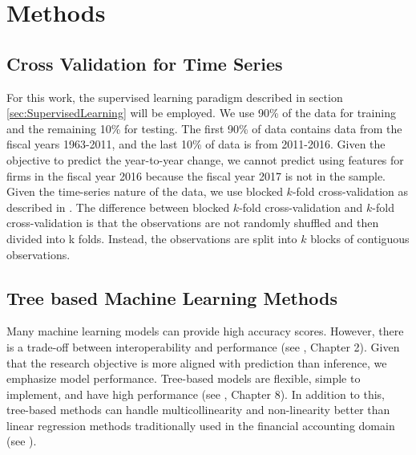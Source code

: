 \section{Methods}

\subsection{Cross Validation for Time Series} \label{sec:CV-TS}

For this work, the supervised learning paradigm described in section \ref{sec:SupervisedLearning} will be employed.  We use 90\% of the data for training and the remaining 10\% for testing. The first 90\% of data contains data from the fiscal years 1963-2011, and the last 10\% of data is from 2011-2016.  Given the objective to predict the year-to-year change, we cannot predict using features for firms in the fiscal year 2016 because the fiscal year 2017 is not in the sample. Given the time-series nature of the data, we use blocked \(k\)-fold cross-validation as described in \cite{cerqueira2019evaluating}. The difference between blocked \(k\)-fold cross-validation and \(k\)-fold cross-validation is that the observations are not randomly shuffled and then divided into k folds. Instead, the observations are split into \(k\) blocks of contiguous observations. 


\subsection{Tree based Machine Learning Methods}

Many machine learning models can provide high accuracy scores. However, there is a trade-off between interoperability and performance (see  \cite{ISL}, Chapter 2).  Given that the research objective is more aligned with prediction than inference, we emphasize model performance. Tree-based models are flexible, simple to implement, and have high performance (see \cite{ISL},  Chapter 8). In addition to this, tree-based methods can handle multicollinearity and non-linearity better than linear regression methods traditionally used in the financial accounting domain (see \cite{Monahan}).  

